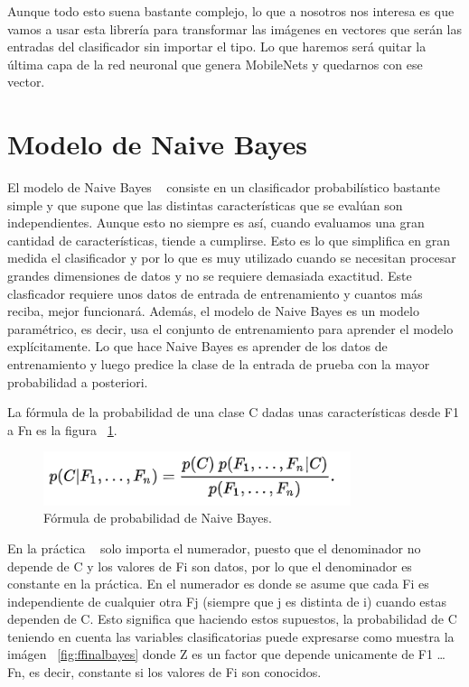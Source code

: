 \documentclass[a4paper, 12pt]{book}
\begin{document}
Aunque todo esto suena bastante complejo, lo que a nosotros nos interesa es que vamos a usar esta librería para transformar las imágenes en vectores que serán las entradas del clasificador sin importar el tipo. Lo que haremos será quitar la última capa de la red neuronal que genera MobileNets y quedarnos con ese vector.

\section{Modelo de Naive Bayes} 
\label{sec:modelobayes}

El modelo de Naive Bayes ~\cite{articulobayes} consiste en un clasificador probabilístico bastante simple y que supone que las distintas características que se evalúan son independientes. Aunque esto no siempre es así, cuando evaluamos una gran cantidad de características, tiende a cumplirse. Esto es lo que simplifica en gran medida el clasificador y por lo que es muy utilizado cuando se necesitan procesar grandes dimensiones de datos y no se requiere demasiada exactitud. Este clasficador requiere unos datos de entrada de entrenamiento y cuantos más reciba, mejor funcionará. Además, el modelo de Naive Bayes es un modelo paramétrico, es decir, usa el conjunto de entrenamiento para aprender el modelo explícitamente. Lo que hace Naive Bayes es aprender de los datos de entrenamiento y luego predice la clase de la entrada de prueba con la mayor probabilidad a posteriori.

La fórmula de la probabilidad de una clase C dadas unas características desde F1 a Fn es la figura ~\ref{fig:formulabayes}.

\begin{figure}
	\centering
	\includegraphics[width=9cm, keepaspectratio]{img/formulabayes}
	\caption{Fórmula de probabilidad de Naive Bayes.}
	\label{fig:formulabayes}
\end{figure}

En la práctica ~\cite{machinelearning} solo importa el numerador, puesto que el denominador no depende de C y los valores de Fi son datos, por lo que el denominador es constante en la práctica. En el numerador es donde se asume que cada Fi es independiente de cualquier otra Fj (siempre que j es distinta de i) cuando estas dependen de C. Esto significa que haciendo estos supuestos, la probabilidad de C teniendo en cuenta las variables clasificatorias puede expresarse como muestra la imágen ~\ref{fig:ffinalbayes} donde Z es un factor que depende unicamente de F1 \dots Fn, es decir, constante si los valores de Fi son conocidos.
\end{document}
